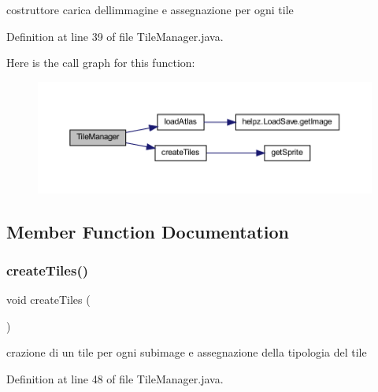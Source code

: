 costruttore carica dell\textquotesingle{}immagine e assegnazione per ogni tile 



Definition at line 39 of file Tile\+Manager.\+java.

Here is the call graph for this function\+:
\nopagebreak
\begin{figure}[H]
\begin{center}
\leavevmode
\includegraphics[width=350pt]{classmanagers_1_1_tile_manager_a041c1b12a4eb5574dfedf0af6393c014_cgraph}
\end{center}
\end{figure}


\subsection{Member Function Documentation}
\mbox{\label{classmanagers_1_1_tile_manager_abb7fa074b36e6e355db16761115fb367}} 
\subsubsection{\texorpdfstring{create\+Tiles()}{createTiles()}}
{\footnotesize\ttfamily void create\+Tiles (\begin{DoxyParamCaption}{ }\end{DoxyParamCaption})\hspace{0.3cm}{\ttfamily [private]}}



crazione di un tile per ogni subimage e assegnazione della tipologia del tile 



Definition at line 48 of file Tile\+Manager.\+java.

